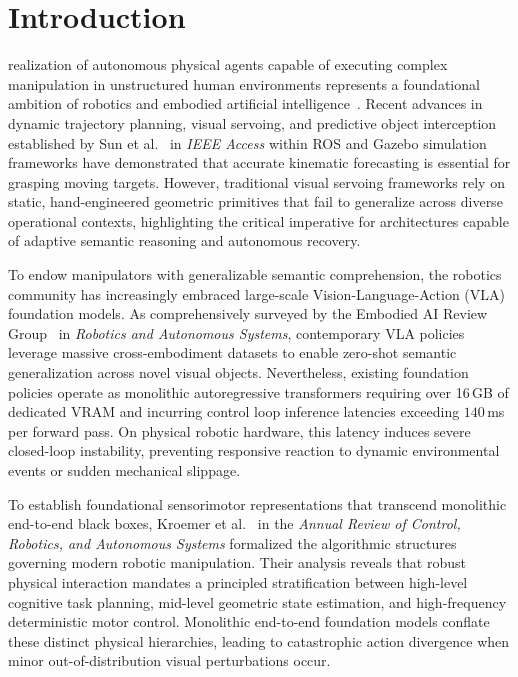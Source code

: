 \documentclass[journal]{IEEEtran}
\begin{document}
\IEEEpeerreviewmaketitle

\section{Introduction}
 realization of autonomous physical agents capable of executing complex manipulation in unstructured human environments represents a foundational ambition of robotics and embodied artificial intelligence~\cite{aria_base_sun2022moving}. Recent advances in dynamic trajectory planning, visual servoing, and predictive object interception established by Sun et al.~\cite{aria_base_sun2022moving} in \textit{IEEE Access} within ROS and Gazebo simulation frameworks have demonstrated that accurate kinematic forecasting is essential for grasping moving targets. However, traditional visual servoing frameworks rely on static, hand-engineered geometric primitives that fail to generalize across diverse operational contexts, highlighting the critical imperative for architectures capable of adaptive semantic reasoning and autonomous recovery.

To endow manipulators with generalizable semantic comprehension, the robotics community has increasingly embraced large-scale Vision-Language-Action (VLA) foundation models. As comprehensively surveyed by the Embodied AI Review Group~\cite{aria_027_group_2024_visionlanguageaction} in \textit{Robotics and Autonomous Systems}, contemporary VLA policies leverage massive cross-embodiment datasets to enable zero-shot semantic generalization across novel visual objects. Nevertheless, existing foundation policies operate as monolithic autoregressive transformers requiring over 16\,GB of dedicated VRAM and incurring control loop inference latencies exceeding $140$\,ms per forward pass. On physical robotic hardware, this latency induces severe closed-loop instability, preventing responsive reaction to dynamic environmental events or sudden mechanical slippage.

To establish foundational sensorimotor representations that transcend monolithic end-to-end black boxes, Kroemer et al.~\cite{kroemer2021review} in the \textit{Annual Review of Control, Robotics, and Autonomous Systems} formalized the algorithmic structures governing modern robotic manipulation. Their analysis reveals that robust physical interaction mandates a principled stratification between high-level cognitive task planning, mid-level geometric state estimation, and high-frequency deterministic motor control. Monolithic end-to-end foundation models conflate these distinct physical hierarchies, leading to catastrophic action divergence when minor out-of-distribution visual perturbations occur.
\end{document}
